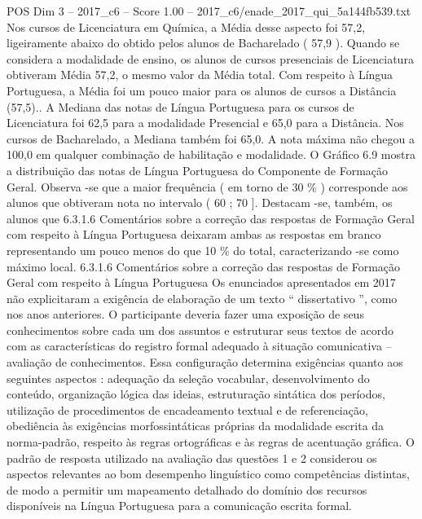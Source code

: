 \begin{textsample}{POS Dim 3 – 2017\_c6 – Score 1.00 – 2017\_c6/enade\_2017\_qui\_5a144fb539.txt}
Nos cursos de Licenciatura em Química, a Média desse aspecto foi 57,2, ligeiramente abaixo do obtido pelos alunos de Bacharelado ( 57,9 ).
Quando se considera a modalidade de ensino, os alunos de cursos presenciais de Licenciatura obtiveram Média 57,2, o mesmo valor da Média total.
Com respeito à Língua Portuguesa, a Média foi um pouco maior para os alunos de cursos a Distância (57,5)..
A Mediana das notas de Língua Portuguesa para os cursos de Licenciatura foi 62,5 para a modalidade Presencial e 65,0 para a Distância.
Nos cursos de Bacharelado, a Mediana também foi 65,0.
A nota máxima não chegou a 100,0 em qualquer combinação de habilitação e modalidade.
O Gráfico 6.9 mostra a distribuição das notas de Língua Portuguesa do Componente de Formação Geral.
Observa -se que a maior frequência ( em torno de 30 \% ) corresponde aos alunos que obtiveram nota no intervalo ( 60 ; 70 ].
Destacam -se, também, os alunos que 6.3.1.6 Comentários sobre a correção das respostas de Formação Geral com respeito à Língua Portuguesa deixaram ambas as respostas em branco representando um pouco menos do que 10 \% do total, caracterizando -se como máximo local. 6.3.1.6 Comentários sobre a correção das respostas de Formação Geral com respeito à Língua Portuguesa Os enunciados apresentados em 2017 não explicitaram a exigência de elaboração de um texto “ dissertativo ”, como nos anos anteriores.
O participante deveria fazer uma exposição de seus conhecimentos sobre cada um dos assuntos e estruturar seus textos de acordo com as características do registro formal adequado à situação comunicativa – avaliação de conhecimentos.
Essa configuração determina exigências quanto aos seguintes aspectos : adequação da seleção vocabular, desenvolvimento do conteúdo, organização lógica das ideias, estruturação sintática dos períodos, utilização de procedimentos de encadeamento textual e de referenciação, obediência às exigências morfossintáticas próprias da modalidade escrita da norma-padrão, respeito às regras ortográficas e às regras de acentuação gráfica.
O padrão de resposta utilizado na avaliação das questões 1 e 2 considerou os aspectos relevantes ao bom desempenho linguístico como competências distintas, de modo a permitir um mapeamento detalhado do domínio dos recursos disponíveis na Língua Portuguesa para a comunicação escrita formal.

\end{textsample}
